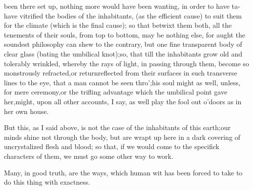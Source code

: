 \documentclass{article}
\begin{document}
\noindent
{}
been there set up,
nothing more would have been wanting, in order to have ta-  
\sic\break
{}
have vitrified the
bodies of the inhabitants, (as the efficient cause) to suit them
for the climate (which is the final cause); so that betwixt them
both, all the tenements of their souls, from top to bottom, may
be nothing else, for aught the soundest philosophy can shew to
the contrary, but one fine transparent body of clear glass
(bating the umbilical knot);\tsk\break  so, that till the inhabitants
grow old and tolerably wrinkled, whereby the rays of light, in
passing through them, become so monstrously refracted,\tsh  or
return\break reflected from their surfaces in such\break
transverse lines to
the eye, that a man cannot be seen thro’;\tsk  his soul might
as well, unless, for mere ceremony,\tsk or the trifling advantage
which the umbilical point gave her,\tsk  might, upon all other
accounts, I say, as well play the fool out o’doors as in her own
house.

But this, as I said above, is not the case of the inhabitants of
this earth;\tsk  our minds shine not through the body, but are wrapt
up here in a dark covering of uncrystalized flesh and blood; so
that, if we would come to the specifick characters of them, we must
go some other way to work.

Many, in good truth, are the ways, which human wit has been
forced to take to do this thing with exactness.
\end{document}
